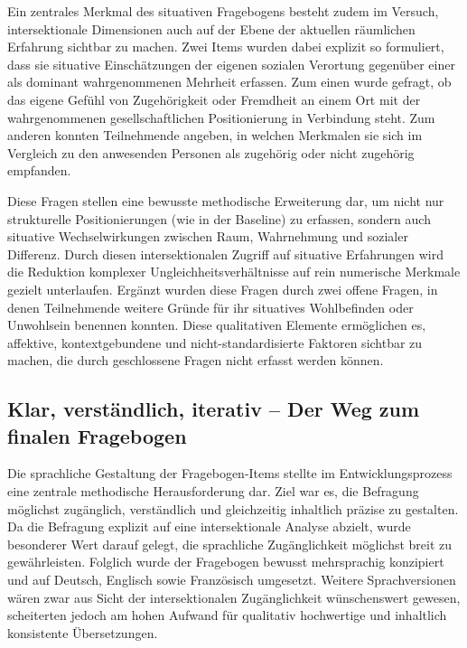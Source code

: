 Ein zentrales Merkmal des situativen Fragebogens besteht zudem im Versuch, intersektionale Dimensionen auch auf der Ebene der aktuellen räumlichen Erfahrung sichtbar zu machen. Zwei Items wurden dabei explizit so formuliert, dass sie situative Einschätzungen der eigenen sozialen Verortung gegenüber einer als dominant wahrgenommenen Mehrheit erfassen. Zum einen wurde gefragt, ob das eigene Gefühl von Zugehörigkeit oder Fremdheit an einem Ort mit der wahrgenommenen gesellschaftlichen Positionierung in Verbindung steht. Zum anderen konnten Teilnehmende angeben, in welchen Merkmalen sie sich im Vergleich zu den anwesenden Personen als zugehörig oder nicht zugehörig empfanden.

Diese Fragen stellen eine bewusste methodische Erweiterung dar, um nicht nur strukturelle Positionierungen (wie in der Baseline) zu erfassen, sondern auch situative Wechselwirkungen zwischen Raum, Wahrnehmung und sozialer Differenz. Durch diesen intersektionalen Zugriff auf situative Erfahrungen wird die Reduktion komplexer Ungleichheitsverhältnisse auf rein numerische Merkmale gezielt unterlaufen. Ergänzt wurden diese Fragen durch zwei offene Fragen, in denen Teilnehmende weitere Gründe für ihr situatives Wohlbefinden oder Unwohlsein benennen konnten. Diese qualitativen Elemente ermöglichen es, affektive, kontextgebundene und nicht-standardisierte Faktoren sichtbar zu machen, die durch geschlossene Fragen nicht erfasst werden können.

\subsection{Klar, verständlich, iterativ – Der Weg zum finalen Fragebogen}

Die sprachliche Gestaltung der Fragebogen-Items stellte im Entwicklungsprozess eine zentrale methodische Herausforderung dar. Ziel war es, die Befragung möglichst zugänglich, verständlich und gleichzeitig inhaltlich präzise zu gestalten. Da die Befragung explizit auf eine intersektionale Analyse abzielt, wurde besonderer Wert darauf gelegt, die sprachliche Zugänglichkeit möglichst breit zu gewährleisten. Folglich wurde der Fragebogen bewusst mehrsprachig konzipiert und auf Deutsch, Englisch sowie Französisch umgesetzt. Weitere Sprachversionen wären zwar aus Sicht der intersektionalen Zugänglichkeit wünschenswert gewesen, scheiterten jedoch am hohen Aufwand für qualitativ hochwertige und inhaltlich konsistente Übersetzungen.

